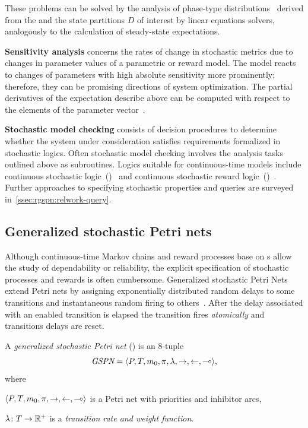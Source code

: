These problems can be solved by the analysis of phase-type distributions~\citep{Neuts75phasetype} derived from the  and the state partitions \(D\) of interest by linear equations solvers, analogously to the calculation of steady-state expectations.

\newpara \textbf{Sensitivity analysis} concerns the rates of change in stochastic metrics due to changes in parameter values of a parametric  or reward model. The model reacts to changes of parameters with high absolute sensitivity  more prominently; therefore, they can be promising directions of system optimization. The partial derivatives of the expectation describe above can be computed with respect to the elements of the parameter vector~\citep{Blake88sensitivity,Ramesh93sensitivity}.

\newpara \textbf{Stochastic model checking} consists of decision procedures to determine whether the system under consideration satisfies requirements formalized in stochastic logics. Often stochastic model checking involves the analysis tasks outlined above as subroutines. Logics suitable for continuous-time models include continuous stochastic logic~()~\citep{Aziz96csl} and continuous stochastic reward logic~()~\citep{Kwiatkowska06csrl}. Further approaches to specifying stochastic properties and queries are surveyed in~\vref{ssec:rgspn:relwork-query}.

\subsection{Generalized stochastic Petri nets}
\label{ssec:background:gspn}

Although continuous-time Markov chains and reward processes base on s allow the study of dependability or reliability, the explicit specification of stochastic processes and rewards is often cumbersome. Generalized stochastic Petri Nets extend Petri nets by assigning exponentially distributed random delays to some transitions and instantaneous random firing to others~\citep{Marsan84gspn}. After the delay associated with an enabled transition is elapsed the transition fires \emph{atomically} and transitions delays are reset.

\begin{dfn}
  A \emph{generalized stochastic Petri net} () is an 8-tuple
  \begin{equation}
    \textit{GSPN} = \langle P, T, m_0, \pi, \lambda, {\rightarrow}, {\leftarrow}, {\multimap} \rangle \text,
  \end{equation}
  where
  \begin{compactitem}
  \item \(\langle P, T, m_0, \pi, {\rightarrow}, {\leftarrow}, {\multimap} \rangle\) is a Petri net with priorities and inhibitor arcs,
  \item \(\lambda\colon T \to \mathbb{R}^{+}\) is a \emph{transition rate and weight function}.
  \end{compactitem}
\end{dfn}

